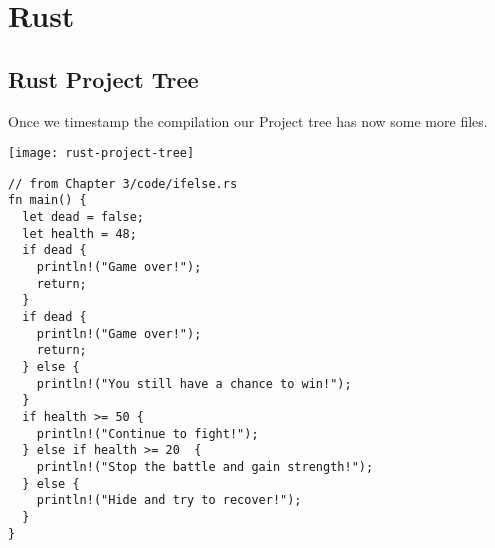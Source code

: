 \chapter{Rust}


\section{Rust Project Tree}

Once we timestamp the compilation our Project tree has now some more files.

\texttt{[image: rust-project-tree]}


\begin{verbatim}
// from Chapter 3/code/ifelse.rs
fn main() {
  let dead = false;
  let health = 48;
  if dead {
    println!("Game over!");
    return;
  }
  if dead {
    println!("Game over!");
    return;
  } else {
    println!("You still have a chance to win!");
  }
  if health >= 50 {
    println!("Continue to fight!");
  } else if health >= 20  {
    println!("Stop the battle and gain strength!");
  } else {
    println!("Hide and try to recover!");
  }
}
\end{verbatim}